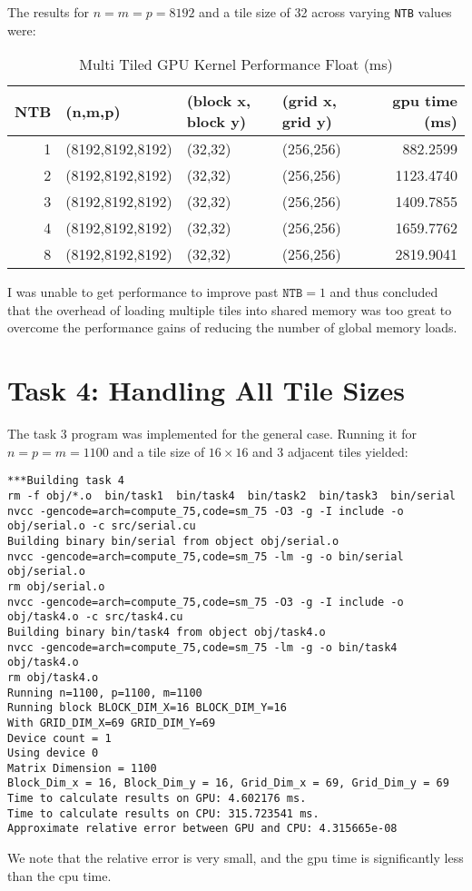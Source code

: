 \documentclass{article}
\begin{document}
The results for $n = m = p = 8192$ and a tile size of 32 across varying \texttt{NTB} values were:
\begin{table}[H]
    \centering
    \caption{Multi Tiled GPU Kernel Performance Float (ms)}
    \fontsize{12}{14}\selectfont
    \begin{tabular}[t]{rlllr}
    \toprule
    NTB & (n,m,p) & (block x, block y) & (grid x, grid y) & gpu time (ms)\\
    \midrule
    1 & (8192,8192,8192) & (32,32) & (256,256) & 882.2599\\
    2 & (8192,8192,8192) & (32,32) & (256,256) & 1123.4740\\
    3 & (8192,8192,8192) & (32,32) & (256,256) & 1409.7855\\
    4 & (8192,8192,8192) & (32,32) & (256,256) & 1659.7762\\
    8 & (8192,8192,8192) & (32,32) & (256,256) & 2819.9041\\
    \bottomrule
    \end{tabular}
\end{table}
\noindent I was unable to get performance to improve past $\texttt{NTB} = 1$ and thus 
concluded that the overhead of loading multiple tiles into shared memory was too great 
to overcome the performance gains of reducing the number of global memory loads.

\section{Task 4: Handling All Tile Sizes}
The task 3 program was implemented for the general case. Running it for $n=p=m=1100$ and 
a tile size of $16\times 16$ and 3 adjacent tiles yielded:
\begin{verbatim}
***Building task 4
rm -f obj/*.o  bin/task1  bin/task4  bin/task2  bin/task3  bin/serial 
nvcc -gencode=arch=compute_75,code=sm_75 -O3 -g -I include -o obj/serial.o -c src/serial.cu
Building binary bin/serial from object obj/serial.o
nvcc -gencode=arch=compute_75,code=sm_75 -lm -g -o bin/serial obj/serial.o
rm obj/serial.o
nvcc -gencode=arch=compute_75,code=sm_75 -O3 -g -I include -o obj/task4.o -c src/task4.cu
Building binary bin/task4 from object obj/task4.o
nvcc -gencode=arch=compute_75,code=sm_75 -lm -g -o bin/task4 obj/task4.o
rm obj/task4.o
Running n=1100, p=1100, m=1100
Running block BLOCK_DIM_X=16 BLOCK_DIM_Y=16
With GRID_DIM_X=69 GRID_DIM_Y=69
Device count = 1
Using device 0
Matrix Dimension = 1100
Block_Dim_x = 16, Block_Dim_y = 16, Grid_Dim_x = 69, Grid_Dim_y = 69
Time to calculate results on GPU: 4.602176 ms.
Time to calculate results on CPU: 315.723541 ms.
Approximate relative error between GPU and CPU: 4.315665e-08
\end{verbatim}
We note that the relative error is very small, and the gpu time is significantly
less than the cpu time.
\end{document}

